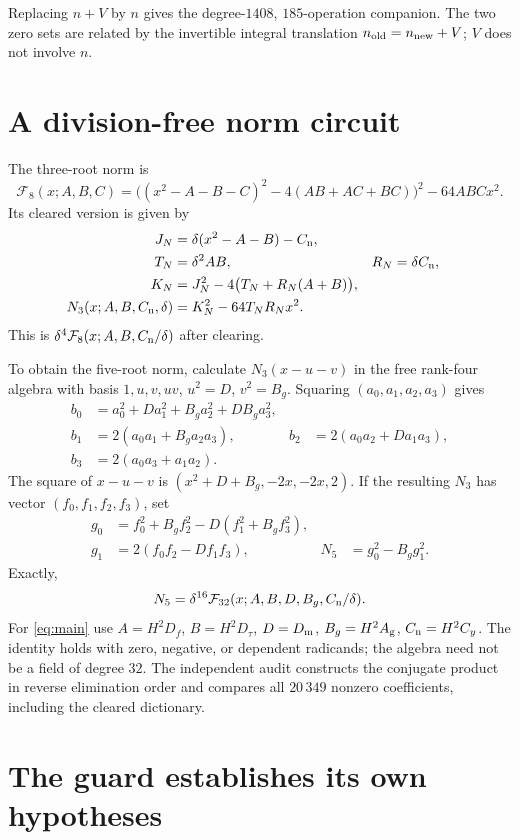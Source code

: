 \documentclass[11pt,a4paper]{article}
\theoremstyle{definition}\newtheorem{definition}[theorem]{Definition}
\theoremstyle{remark}\newtheorem{remark}[theorem]{Remark}
\newcommand{\F}{\mathcal F}\newcommand{\Cal}{\mathcal K}
\newcommand{\Dm}{D_{\rm m}}\newcommand{\Dt}{D_{\tau}}
\newcommand{\Df}{D_f}\newcommand{\Dy}{D_y}\newcommand{\Ag}{A_{\rm g}}
\newcommand{\Cn}{C_{\rm n}}\newcommand{\Rtop}{R_{\rm top}}
\numberwithin{equation}{section}
\begin{document}
Replacing \(n+V\) by \(n\) gives the degree-\(1408\), \(185\)-operation
companion. The two zero sets are related by the invertible integral
translation \(n_{\rm old}=n_{\rm new}+V\); \(V\) does not involve \(n\).

\section{A division-free norm circuit}\label{sec:circuit}

The three-root norm is
\[
\F_8(x;A,B,C)=
\bigl((x^2-A-B-C)^2-4(AB+AC+BC)\bigr)^2-64ABCx^2.
\]
Its cleared version is given by
\begin{align}
J_N&=\delta(x^2-A-B)-\Cn,\nonumber\\
T_N&=\delta^2AB,&R_N&=\delta\Cn,\nonumber\\
K_N&=J_N^2-4\bigl(T_N+R_N(A+B)\bigr),\nonumber\\
N_3(x;A,B,\Cn,\delta)&=K_N^2-64T_NR_Nx^2.
\label{eq:cleared3}
\end{align}
This is \(\delta^4\F_8(x;A,B,\Cn/\delta)\) after clearing.

To obtain the five-root norm, calculate \(N_3(x-u-v)\) in the free
rank-four algebra with basis \(1,u,v,uv\), \(u^2=D\), \(v^2=B_g\).
Squaring \((a_0,a_1,a_2,a_3)\) gives
\begin{align}
b_0&=a_0^2+Da_1^2+B_ga_2^2+DB_ga_3^2,\nonumber\\
b_1&=2(a_0a_1+B_ga_2a_3),&
b_2&=2(a_0a_2+Da_1a_3),\nonumber\\
b_3&=2(a_0a_3+a_1a_2).
\label{eq:biquad}
\end{align}
The square of \(x-u-v\) is
\((x^2+D+B_g,-2x,-2x,2)\).
If the resulting \(N_3\) has vector \((f_0,f_1,f_2,f_3)\), set
\begin{align}
g_0&=f_0^2+B_gf_2^2-D(f_1^2+B_gf_3^2),\nonumber\\
g_1&=2(f_0f_2-Df_1f_3),&
N_5&=g_0^2-B_gg_1^2.
\label{eq:norm5circuit}
\end{align}
Exactly,
\[
N_5=\delta^{16}\F_{32}(x;A,B,D,B_g,\Cn/\delta).
\]
For \eqref{eq:main} use \(A=H^2\Df\), \(B=H^2\Dt\),
\(D=\Dm\), \(B_g=H^2\Ag\), \(\Cn=H^2C_y\).
The identity holds with zero, negative, or dependent radicands;
the algebra need not be a field of degree \(32\).
The independent audit constructs the conjugate product in reverse
elimination order and compares all \(20\,349\) nonzero coefficients,
including the cleared dictionary.

\section{The guard establishes its own hypotheses}\label{sec:bootstrap}
\end{document}
